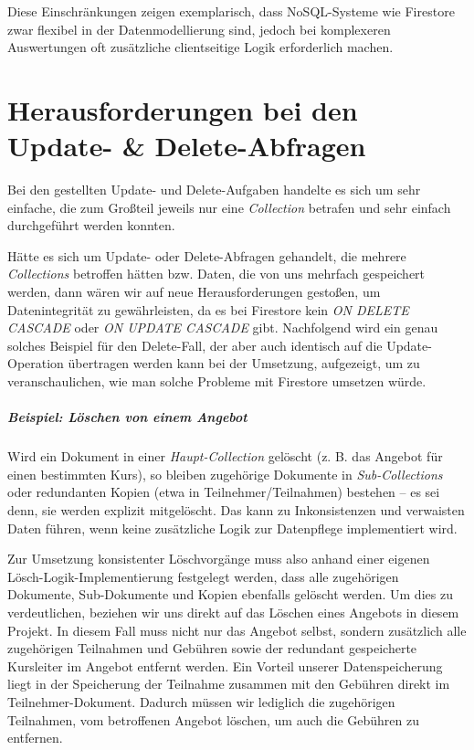 \documentclass[12pt,a4paper%
              ,oneside     %
              ,titlepage
              ,DIV=13
              ,headinclude
              ,footinclude=false%
              ,cleardoublepage=empty%
              ,parskip=half,
              BCOR=0mm,
              ]{scrreprt}
\begin{document}
Diese Einschränkungen zeigen exemplarisch, dass NoSQL-Systeme wie Firestore zwar flexibel in der Datenmodellierung sind, jedoch bei komplexeren Auswertungen oft zusätzliche clientseitige Logik erforderlich machen.

\chapter{Herausforderungen bei den Update- \& Delete-Abfragen}
\label{update-delete-chapter}

Bei den gestellten Update- und Delete-Aufgaben handelte es sich um sehr einfache, die zum Großteil jeweils nur eine \textit{Collection} betrafen und sehr einfach durchgeführt werden konnten. 

Hätte es sich um Update- oder Delete-Abfragen gehandelt, die mehrere \textit{Collections} betroffen hätten bzw. Daten, die von uns mehrfach gespeichert werden, dann wären wir auf neue Herausforderungen gestoßen, um Datenintegrität zu gewährleisten, da es bei Firestore kein \textit{ON DELETE CASCADE} oder \textit{ON UPDATE CASCADE} gibt. Nachfolgend wird ein genau solches Beispiel für den Delete-Fall, der aber auch identisch auf die Update-Operation übertragen werden kann bei der Umsetzung, aufgezeigt, um zu veranschaulichen, wie man solche Probleme mit Firestore umsetzen würde.

\paragraph{\textbf{Beispiel}: Löschen von einem Angebot}
Wird ein Dokument in einer \textit{Haupt-Collection} gelöscht (z. B. das Angebot für einen bestimmten Kurs), so bleiben zugehörige Dokumente in \textit{Sub-Collections} oder redundanten Kopien (etwa in Teilnehmer/Teilnahmen) bestehen – es sei denn, sie werden explizit mitgelöscht. Das kann zu Inkonsistenzen und verwaisten Daten führen, wenn keine zusätzliche Logik zur Datenpflege implementiert wird.

Zur Umsetzung konsistenter Löschvorgänge muss also anhand einer eigenen Lösch-Logik-Implementierung festgelegt werden, dass alle zugehörigen Dokumente, Sub-Dokumente und Kopien ebenfalls gelöscht werden. Um dies zu verdeutlichen, beziehen wir uns direkt auf das Löschen eines Angebots in diesem Projekt. In diesem Fall muss nicht nur das Angebot selbst, sondern zusätzlich alle zugehörigen Teilnahmen und Gebühren sowie der redundant gespeicherte Kursleiter im Angebot entfernt werden.
Ein Vorteil unserer Datenspeicherung liegt in der Speicherung der Teilnahme zusammen mit den Gebühren direkt im Teilnehmer-Dokument. Dadurch müssen wir lediglich die zugehörigen Teilnahmen, vom betroffenen Angebot löschen, um auch die Gebühren zu entfernen.
\end{document}
